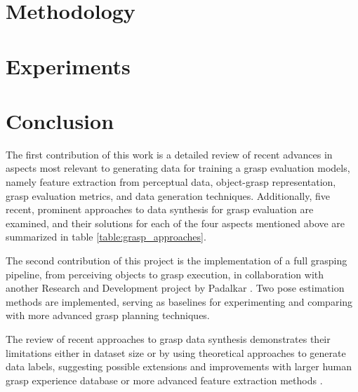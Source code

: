 \documentclass[runningheads]{../llncs}
\begin{document}
\section{Methodology}

\section{Experiments}

\section{Conclusion}

The first contribution of this work is a detailed review of recent advances in aspects most relevant to generating data
for training a grasp evaluation models, namely feature extraction from perceptual data, object-grasp representation,
grasp evaluation metrics, and data generation techniques. Additionally, five recent, prominent approaches to data
synthesis for grasp evaluation are examined, and their solutions for each of the four aspects mentioned above are
summarized in table \ref{table:grasp_approaches}.

The second contribution of this project is the implementation of a full grasping pipeline, from perceiving objects to
grasp execution, in collaboration with another Research and Development project by Padalkar \cite{Padalkar2018}. Two
pose estimation methods are implemented, serving as baselines for experimenting and comparing with more advanced grasp
planning techniques.

The review of recent approaches to grasp data synthesis demonstrates their limitations either in dataset size or by
using theoretical approaches to generate data labels, suggesting possible extensions and improvements with larger human
grasp experience database \cite{Saudabayev2018} or more advanced feature extraction methods \cite{Varley2017}.

%


%
\end{document}

